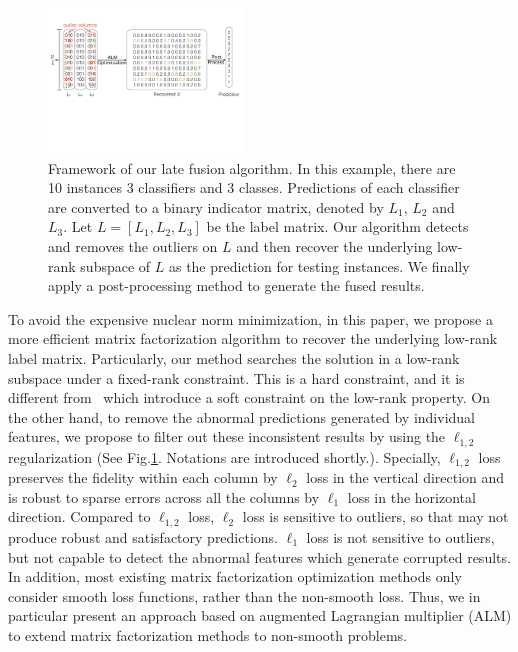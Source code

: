 \documentclass[letterpaper]{article} %
\def\calC{{\mathcal{C}}}
\begin{document}
\begin{figure}[!t]
\begin{center}
\includegraphics[width=0.46\textwidth]{resource/frame_work.pdf}
\end{center}
\caption{Framework of our late fusion algorithm.
In this example, there are 10 instances 3 classifiers and 3 classes.
Predictions of each classifier are converted to a binary indicator matrix,
denoted by $L_1$, $L_2$ and $L_3$.
Let $L = [L_1, L_2, L_3]$ be the label matrix.
Our algorithm detects and removes the outliers on $L$ and then recover the underlying low-rank subspace of $L$ as the prediction for testing instances.
We finally apply a post-processing method to generate the fused results.
}
\label{fig:framework}
\end{figure}

To avoid the expensive nuclear norm minimization,
in this paper, we propose a more efficient matrix factorization algorithm to recover the underlying low-rank label matrix.
Particularly, our method searches the solution in a low-rank subspace under a fixed-rank constraint.
This is a hard constraint, and it is different from~\cite{gaoijcai2016robust,ye2012robust} which introduce a soft constraint on the low-rank property.
On the other hand, to remove the abnormal predictions generated by individual features, we propose to filter out these inconsistent results by using the $\ell_{1,2}$ regularization (See Fig.\ref{fig:framework}.
Notations are introduced shortly.).
Specially, $\ell_{1,2}$ loss preserves the fidelity within each column by $\ell_{2}$ loss in the vertical direction and is robust to sparse errors across all the columns by $\ell_{1}$ loss in the horizontal direction.
Compared to $\ell_{1,2}$ loss, $\ell_{2}$ loss is sensitive to outliers, so that may not produce robust and satisfactory predictions.
$\ell_{1}$ loss is not sensitive to outliers, but not capable to detect the abnormal features which generate corrupted results.
In addition, most existing matrix factorization optimization methods only consider smooth loss functions, rather than the non-smooth loss.
Thus, we in particular present an approach based on augmented Lagrangian multiplier (ALM) to extend matrix factorization methods to non-smooth problems.
\end{document}

